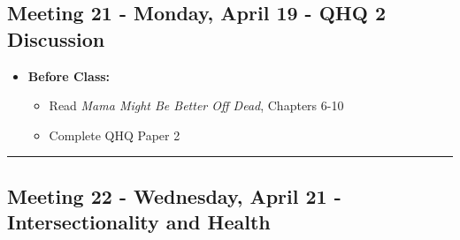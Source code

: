 \documentclass[
]{book}
\providecommand{\tightlist}{%
  \setlength{\itemsep}{0pt}\setlength{\parskip}{0pt}}
\begin{document}
\hypertarget{meeting-21---monday-april-19---qhq-2-discussion}{%
\subsection*{Meeting 21 - Monday, April 19 - QHQ 2 Discussion}\label{meeting-21---monday-april-19---qhq-2-discussion}}

\begin{itemize}
\tightlist
\item
  \textbf{Before Class:}

  \begin{itemize}
  \tightlist
  \item
    Read \emph{Mama Might Be Better Off Dead}, Chapters 6-10
  \item
    Complete QHQ Paper 2
  \end{itemize}
\end{itemize}

\begin{center}\rule{0.5\linewidth}{0.5pt}\end{center}

\hypertarget{meeting-22---wednesday-april-21---intersectionality-and-health}{%
\subsection*{Meeting 22 - Wednesday, April 21 - Intersectionality and Health}\label{meeting-22---wednesday-april-21---intersectionality-and-health}}
\end{document}
